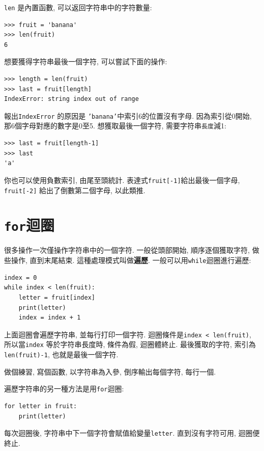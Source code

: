 \documentclass[10pt]{book}
\begin{document}
{\tt len} 是內置函數, 可以返回字符串中的字符數量:

\begin{verbatim}
>>> fruit = 'banana'
>>> len(fruit)
6
\end{verbatim}
%
想要獲得字符串最後一個字符, 可以嘗試下面的操作:

\begin{verbatim}
>>> length = len(fruit)
>>> last = fruit[length]
IndexError: string index out of range
\end{verbatim}
%
報出{\tt IndexError} 的原因是 {\tt 'banana'}中索引6的位置沒有字母. 
因為索引從0開始, 那6個字母對應的數字是0至5.
想獲取最後一個字符, 需要字符串{\tt 長度}減1:

\begin{verbatim}
>>> last = fruit[length-1]
>>> last
'a'
\end{verbatim}
%
你也可以使用負數索引, 由尾至頭統計. 
表達式{\tt fruit[-1]}給出最後一個字母, 
{\tt fruit[-2]} 給出了倒數第二個字母, 以此類推. 


\section{{\tt for}迴圈}
\label{for}
很多操作一次僅操作字符串中的一個字符. 
一般從頭部開始, 順序逐個獲取字符, 做些操作, 直到末尾結束. 
這種處理模式叫做{\bf 遍歷}.
一般可以用{\tt while}迴圈進行遍歷:

\begin{verbatim}
index = 0
while index < len(fruit):
    letter = fruit[index]
    print(letter)
    index = index + 1
\end{verbatim}
%
上面迴圈會遍歷字符串, 並每行打印一個字符. 
迴圈條件是{\tt index < len(fruit)}, 
所以當{\tt index} 等於字符串長度時, 條件為假, 迴圈體終止. 
最後獲取的字符, 索引為{\tt len(fruit)-1}, 也就是最後一個字符. 

做個練習, 寫個函數, 以字符串為入參, 倒序輸出每個字符, 每行一個. 

遍歷字符串的另一種方法是用{\tt for}迴圈:

\begin{verbatim}
for letter in fruit:
    print(letter)
\end{verbatim}
%
每次迴圈後, 字符串中下一個字符會賦值給變量{\tt letter}. 
直到沒有字符可用, 迴圈便終止. 
\end{document}
